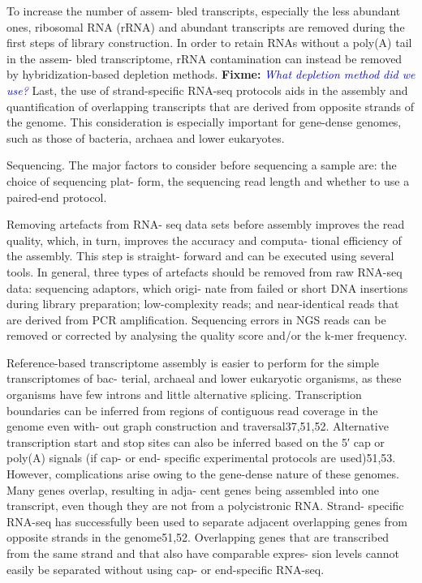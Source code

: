 \documentclass{article}
\newcommand{\fixme}[1]{{\textbf{Fixme:} \textit{\textcolor{blue}{#1}}}}
\begin{document}
To increase the number of assem- bled transcripts, especially the less abundant
ones, ribosomal RNA (rRNA) and abundant transcripts are removed during the
first steps of library construction.
In order to retain RNAs without a poly(A) tail in the assem- bled transcriptome,
rRNA contamination can instead be removed by hybridization-based depletion
methods. \fixme{What depletion method did we use?} 
Last, the use of strand-specific RNA-seq protocols aids in the assembly and
quantification of overlapping transcripts that are derived from opposite strands
of the genome. This consideration is especially important for gene-dense
genomes, such as those of bacteria, archaea and lower eukaryotes.

Sequencing. The major factors to consider before sequencing a sample are: the
choice of sequencing plat- form, the sequencing read length and whether to use a
paired-end protocol.

Removing artefacts from RNA- seq data sets before assembly improves the read
quality, which, in turn, improves the accuracy and computa- tional efficiency of
the assembly. This step is straight- forward and can be executed using several
tools.  In general, three types of artefacts should be removed from raw RNA-seq
data: sequencing adaptors, which origi- nate from failed or short DNA
insertions during library preparation; low-complexity reads; and
near-identical reads that are derived from PCR amplification. 
Sequencing errors in NGS reads can be removed or corrected by analysing the
quality score and/or the k-mer frequency.

Reference-based transcriptome assembly is easier to perform for the simple
transcriptomes of bac- terial, archaeal and lower eukaryotic organisms, as these
organisms have few introns and little alternative splicing. Transcription
boundaries can be inferred from regions of contiguous read coverage in the
genome even with- out graph construction and traversal37,51,52. Alternative
transcription start and stop sites can also be inferred based on the 5′ cap or
poly(A) signals (if cap- or end- specific experimental protocols are used)51,53.
However, complications arise owing to the gene-dense nature of
these genomes. Many genes overlap, resulting in adja- cent genes being assembled
into one transcript, even though they are not from a polycistronic RNA. Strand-
specific RNA-seq has successfully been used to separate adjacent overlapping
genes from opposite strands in the genome51,52. Overlapping genes that are
transcribed from the same strand and that also have comparable expres- sion
levels cannot easily be separated without using cap- or end-specific RNA-seq.
\end{document}
